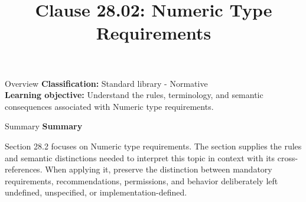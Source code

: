 \documentclass[10pt,letterpaper]{article}
\title{Clause 28.02: Numeric Type Requirements}
\author{}
\date{}
\begin{document}
\maketitle
\begin{CornellOverviewBox}{Overview}
\textbf{Classification:} Standard library - Normative\\[2pt]
\textbf{Learning objective:} Understand the rules, terminology, and semantic consequences associated with Numeric type requirements.
\end{CornellOverviewBox}\begin{CornellSummaryBox}{Summary}
{\sffamily\bfseries\color{Accent} Summary}\par\vspace{3pt}Section 28.2 focuses on Numeric type requirements. The section supplies the rules and semantic distinctions needed to interpret this topic in context with its cross-references. When applying it, preserve the distinction between mandatory requirements, recommendations, permissions, and behavior deliberately left undefined, unspecified, or implementation-defined.
\end{CornellSummaryBox}
\end{document}
